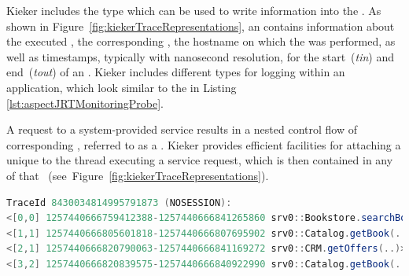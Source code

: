 Kieker includes the \MonitoringRecord{} type \KiekerExecutionRecord{} which can %
be used to write \execution{} information into the \MonitoringLog{}. %
As shown in Figure~\ref{fig:kiekerTraceRepresentations}, an \KiekerExecutionRecord{} %
contains information about the executed \operation{}, the corresponding \component{}, 
the hostname on which the \execution{} was performed, as well as timestamps, %
typically with nanosecond resolution, for the start~(\textit{tin}) and end~(\textit{tout}) %
of an \execution{}. %
Kieker includes different \MonitoringProbe{} types for logging \KiekerExecutionRecords{} %
within an application, which look similar to the \MonitoringProbe{} in Listing~%
\ref{lst:aspectJRTMonitoringProbe}. %

A request to a system-provided service results in a nested control flow of %
corresponding \executions{}, referred to as a \textit{\trace{}}. %
Kieker provides efficient facilities for attaching a unique \traceIdentifier{} %
to the thread executing a service request, which is then contained in any %
\KiekerExecutionRecord{} of that \trace{}~(see~Figure~\ref{fig:kiekerTraceRepresentations}). 

\begin{lstlisting}[language=Java, float=*, numbers=none, xleftmargin=0pt,caption=Kieker.Tpan output of execution trace representation, label=lst:ExecutionRecordMonitoringLogExecutionTrace, basicstyle=\ttfamily\scriptsize]
TraceId 8430034814995791873 (NOSESSION):
<[0,0] 1257440666759412388-1257440666841265860 srv0::Bookstore.searchBook(..)>
<[1,1] 1257440666805601818-1257440666807695902 srv0::Catalog.getBook(..)>
<[2,1] 1257440666820790063-1257440666841169272 srv0::CRM.getOffers(..)>
<[3,2] 1257440666820839575-1257440666840922990 srv0::Catalog.getBook(..)>
\end{lstlisting}


